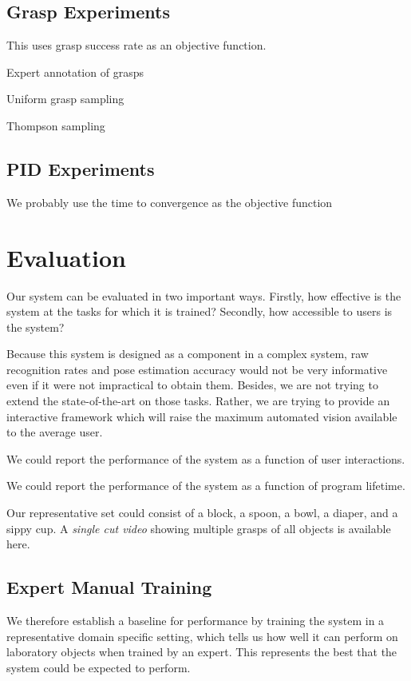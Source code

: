 \documentclass[conference]{IEEEtran}
\begin{document}
\subsection{Grasp Experiments}
This uses grasp success rate as an objective function.

Expert annotation of grasps

Uniform grasp sampling

Thompson sampling

\subsection{PID Experiments}
We probably use the time to convergence as the objective function



\section{Evaluation}
Our system can be evaluated in two important ways. Firstly, how effective is 
the system at the tasks for which it is trained? Secondly, how accessible to users is the system?

Because this system is designed as a component in a complex system, raw recognition rates
and pose estimation accuracy would not be very informative even if it were not impractical to
obtain them.  Besides, we are not trying to extend the state-of-the-art on those tasks. Rather,
we are trying to provide an interactive framework which will raise the maximum automated vision
available to the average user.

We could report the performance of the system as a function of user interactions.

We could report the performance of the system as a function of program lifetime.

Our representative set could consist of a block, a spoon,
a bowl, a diaper, and a sippy cup. A \emph{single cut video} showing multiple grasps
of all objects is available here.

\subsection{Expert Manual Training}
We therefore establish a baseline for performance by training the system in a representative domain
specific setting, which tells us how well it can perform on laboratory objects when trained by an 
expert. This represents the best that the system could be expected to perform.
\end{document}
